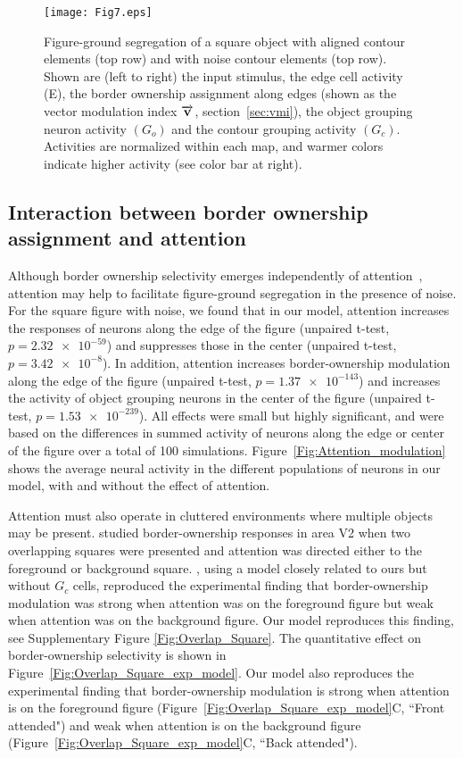\begin{figure*}
\begin{center}
\texttt{[image: Fig7.eps]}
\end{center}
\caption{Figure-ground segregation of a square object with aligned contour elements (top
  row) and with noise contour elements (top row). Shown are (left to right) the input
  stimulus, the edge cell activity (E), the border ownership
  assignment along edges (shown as the vector modulation index 
  $\protect\overrightarrow{\mathbf{v}}$,
  section~\ref{sec:vmi}), the object grouping 
  neuron activity 
$(G_o)$
 and the contour grouping activity
$(G_c)$.
 Activities are normalized within each map, and warmer colors
  indicate higher activity (see color bar at right).}
\label{Fig:Square_Noise}
\end{figure*}

\subsection{Interaction between border ownership assignment and attention} 
\label{sec:BOS-att}

Although border ownership selectivity emerges independently of
attention~\citep{Qiu_etal07}, attention may help to facilitate
figure-ground segregation in the presence of noise.
 For the square figure with noise, we found that 
in our model, attention increases the responses of neurons
along the edge of the figure (unpaired t-test, $p=\num{2.32e-59}$) and
suppresses those in the center (unpaired t-test,
$p=\num{3.42e-8}$). In addition, attention increases border-ownership
modulation along the edge of the figure (unpaired t-test,
$p=\num{1.37e-143}$) and increases the activity of object grouping
neurons in the center of the figure (unpaired t-test,
$p=\num{1.53e-239}$). All effects were small but highly significant,
and were based on the differences in summed activity of neurons along
the edge or center of the figure over a total of 100 simulations.
Figure~\ref{Fig:Attention_modulation} shows the average neural
activity in the different populations of neurons in our model, with
and without the effect of attention.  

Attention must also operate in cluttered environments where multiple
objects may be present. \cite{Qiu_etal07} studied border-ownership
responses in area V2 when two overlapping squares were presented and
attention was directed either to the foreground or background
square. \cite{Mihalas_etal11b}, using a model closely related to ours
but without $G_c$ cells, reproduced the experimental
finding that border-ownership modulation was strong when attention was
on the foreground figure but weak when attention was on the background
figure. Our model reproduces this finding, see Supplementary Figure
\ref{Fig:Overlap_Square}. The quantitative effect on border-ownership
selectivity is shown in Figure~\ref{Fig:Overlap_Square_exp_model}. 
Our model also reproduces the experimental 
finding that border-ownership modulation is strong when attention is
on the foreground figure (Figure~\ref{Fig:Overlap_Square_exp_model}C,
``Front attended") and weak when attention is on the background
figure (Figure~\ref{Fig:Overlap_Square_exp_model}C, ``Back attended").

